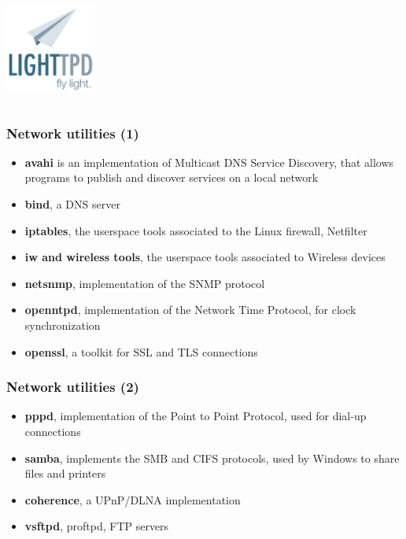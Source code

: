 \begin{frame}
\begin{columns}
    \includegraphics[width=0.9\textwidth]{slides/sysdev-embedded-linux/lighttpd.png}\\
  \end{columns}
\end{frame}

\begin{frame}
  \frametitle{Network utilities (1)}
  \begin{itemize}
  \item {\bf avahi} is an implementation of Multicast DNS Service
    Discovery, that allows programs to publish and discover services
    on a local network
  \item {\bf bind}, a DNS server
  \item {\bf iptables}, the userspace tools associated to the Linux firewall, Netfilter
  \item {\bf iw and wireless tools}, the userspace tools associated to Wireless devices
  \item {\bf netsnmp}, implementation of the SNMP protocol
  \item {\bf openntpd}, implementation of the Network Time Protocol,
    for clock synchronization
  \item {\bf openssl}, a toolkit for SSL and TLS connections
  \end{itemize}
\end{frame}

\begin{frame}
  \frametitle{Network utilities (2)}
  \begin{itemize}
  \item {\bf pppd}, implementation of the Point to Point Protocol,
    used for dial-up connections
  \item {\bf samba}, implements the SMB and CIFS protocols, used by
    Windows to share files and printers
  \item {\bf coherence}, a UPnP/DLNA implementation
  \item {\bf vsftpd}, proftpd, FTP servers
  \end{itemize}
\end{frame}

